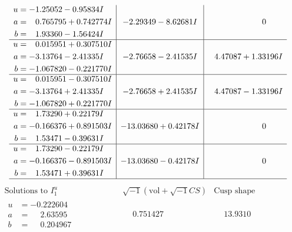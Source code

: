 \documentclass[1p]{elsarticle_modified}
\theoremstyle{definition}
\newcommand{\I}{\sqrt{-1}}
\begin{document}
$$\begin{array}{c|c|c}
\begin{aligned}
u &= -1.25052 - 0.95834 I \\
a &= \phantom{-}0.765795 + 0.742774 I \\
b &= \phantom{-}1.93360 - 1.56424 I\end{aligned}
 & -2.29349 - 8.62681 I & \phantom{-0.000000 } 0 \\ \hline\begin{aligned}
u &= \phantom{-}0.015951 + 0.307510 I \\
a &= -3.13764 - 2.41335 I \\
b &= -1.067820 - 0.221770 I\end{aligned}
 & -2.76658 - 2.41535 I & \phantom{-}4.47087 + 1.33196 I \\ \hline\begin{aligned}
u &= \phantom{-}0.015951 - 0.307510 I \\
a &= -3.13764 + 2.41335 I \\
b &= -1.067820 + 0.221770 I\end{aligned}
 & -2.76658 + 2.41535 I & \phantom{-}4.47087 - 1.33196 I \\ \hline\begin{aligned}
u &= \phantom{-}1.73290 + 0.22179 I \\
a &= -0.166376 + 0.891503 I \\
b &= \phantom{-}1.53471 - 0.39631 I\end{aligned}
 & -13.03680 + 0.42178 I & \phantom{-0.000000 } 0 \\ \hline\begin{aligned}
u &= \phantom{-}1.73290 - 0.22179 I \\
a &= -0.166376 - 0.891503 I \\
b &= \phantom{-}1.53471 + 0.39631 I\end{aligned}
 & -13.03680 - 0.42178 I & \phantom{-0.000000 } 0\\
 \hline 
 \end{array}$$\newpage$$\begin{array}{c|c|c}  
\text{Solutions to }I^u_{1}& \I (\text{vol} + \sqrt{-1}CS) & \text{Cusp shape}\\
 \hline 
\begin{aligned}
u &= -0.222604\phantom{ +0.000000I} \\
a &= \phantom{-}2.63595\phantom{ +0.000000I} \\
b &= \phantom{-}0.204967\phantom{ +0.000000I}\end{aligned}
 & \phantom{-}0.751427\phantom{ +0.000000I} & \phantom{-}13.9310\phantom{ +0.000000I} \\ \hline\begin{aligned}

\end{aligned}
\end{array}$$
\end{document}
